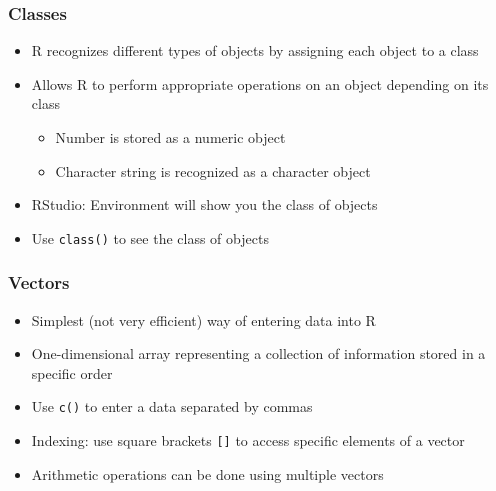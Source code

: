 \documentclass{beamer}
\begin{document}
\begin{frame}
 \frametitle<+->{Classes}
 \begin{itemize}
   \item R recognizes different types of objects by assigning each object to a class
   \item Allows R to perform appropriate operations on an object depending on its class
     \begin{itemize}
       \item Number is stored as a numeric object
       \item Character string is recognized as a character object
     \end{itemize}
   \item RStudio: Environment will show you the class of objects
   \item Use {\tt class()} to see the class of objects
 \end{itemize}
\end{frame}

\begin{frame}
 \frametitle<+->{Vectors}
 \begin{itemize}
   \item Simplest (not very efficient) way of entering data into R
   \item One-dimensional array representing a collection of information stored in a specific order
   \item Use {\tt c()} to enter a data separated by commas
   \item Indexing: use square brackets {\tt []} to access specific elements of a vector
   \item Arithmetic operations can be done using multiple vectors
 \end{itemize}
\end{frame}
\end{document}
